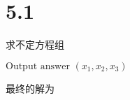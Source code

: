 \section*{5.1}


\begin{algorithm}[!htbp]
  \caption{求不定方程组}
  \begin{algorithmic}[1]
      \State $\text{Output answer } (x_1, x_2, x_3)$
    \EndFor
  \EndProcedure
      \State {}
    \EndFor
  \EndProcedure
      \State {}
    \EndFor
  \EndProcedure
  \end{algorithmic}
\end{algorithm}

最终的解为

